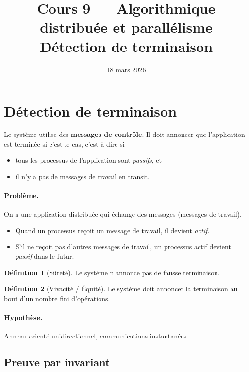 \documentclass[12pt,a4paper]{article}
\title{\textbf{Cours 9 — Algorithmique distribuée et parallélisme}\\
       \large Détection de terminaison}
\date{18 mars 2026}
\author{}
\theoremstyle{definition}
\newtheorem{definition}{Définition}[section]
\theoremstyle{remark}
\begin{document}
\maketitle
\tableofcontents
\bigskip

\section{Détection de terminaison}

Le système utilise des \textbf{messages de contrôle}. Il doit annoncer que
l'application est terminée si c'est le cas, c'est-à-dire si
\begin{itemize}
  \item tous les processus de l'application sont \emph{passifs}, et
  \item il n'y a pas de messages de travail en transit.
\end{itemize}

\paragraph{Problème.}
On a une application distribuée qui échange des messages (messages de travail).
\begin{itemize}
  \item Quand un processus reçoit un message de travail, il devient
        \emph{actif}.
  \item S'il ne reçoit pas d'autres messages de travail, un processus actif
        devient \emph{passif} dans le futur.
\end{itemize}

\begin{definition}[Sûreté]
  Le système n'annonce pas de fausse terminaison.
\end{definition}

\begin{definition}[Vivacité / Équité]
  Le système doit annoncer la terminaison au bout d'un nombre fini
  d'opérations.
\end{definition}

\paragraph{Hypothèse.}
Anneau orienté unidirectionnel, communications instantanées.

\subsection{Preuve par invariant}
\end{document}
